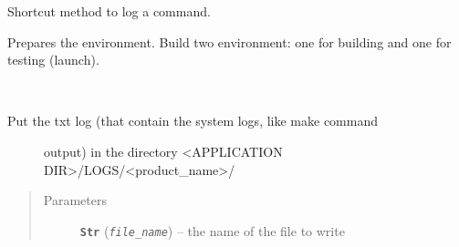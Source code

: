 \documentclass[a4paper,10pt,english]{sphinxmanual}
\begin{document}
\begin{fulllineitems}
\begin{fulllineitems}
\end{fulllineitems}


\begin{fulllineitems}
\label{commands/apidoc/src:src.compilation.Builder.log_command}
Shortcut method to log a command.

\end{fulllineitems}


\begin{fulllineitems}
\label{commands/apidoc/src:src.compilation.Builder.make}
\end{fulllineitems}


\begin{fulllineitems}
\label{commands/apidoc/src:src.compilation.Builder.prepare}
Prepares the environment.
Build two environment: one for building and one for testing (launch).

\end{fulllineitems}


\begin{fulllineitems}
\label{commands/apidoc/src:src.compilation.Builder.put_txt_log_in_appli_log_dir}~\begin{description}
\item[{Put the txt log (that contain the system logs, like make command}] \leavevmode
output) in the directory \textless{}APPLICATION DIR\textgreater{}/LOGS/\textless{}product\_name\textgreater{}/

\end{description}
\begin{quote}\begin{description}
\item[{Parameters}] \leavevmode
\textbf{\texttt{Str}} (\emph{\texttt{file\_name}}) -- the name of the file to write

\end{description}\end{quote}

\end{fulllineitems}


\begin{fulllineitems}
\label{commands/apidoc/src:src.compilation.Builder.wmake}
\end{fulllineitems}


\end{fulllineitems}
\end{document}
